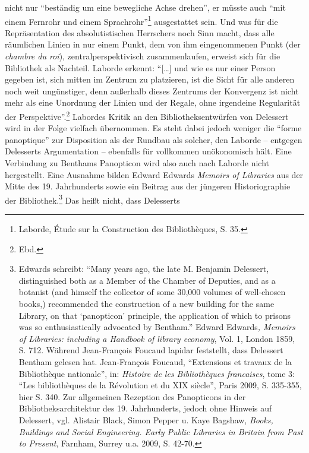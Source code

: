 nicht nur \enquote{beständig um eine bewegliche Achse drehen}, er müsste
auch \enquote{mit einem Fernrohr und einem Sprachrohr}\footnote{Laborde,
  Étude sur la Construction des Bibliothèques, S. 35.} ausgestattet
sein. Und was für die Repräsentation des absolutistischen Herrschers
noch Sinn macht, dass alle räumlichen Linien in nur einem Punkt, dem von
ihm eingenommenen Punkt (der \emph{chambre du roi}),
zentralperspektivisch zusammenlaufen, erweist sich für die Bibliothek
als Nachteil. Laborde erkennt: \enquote{{[}\ldots{}{]} und wie es nur
einer Person gegeben ist, sich mitten im Zentrum zu platzieren, ist die
Sicht für alle anderen noch weit ungünstiger, denn außerhalb dieses
Zentrums der Konvergenz ist nicht mehr als eine Unordnung der Linien und
der Regale, ohne irgendeine Regularität der Perspektive}.\footnote{Ebd.}
Labordes Kritik an den Bibliotheksentwürfen von Delessert wird in der
Folge vielfach übernommen. Es steht dabei jedoch weniger die
\enquote{forme panoptique} zur Disposition als der Rundbau als solcher,
den Laborde -- entgegen Delesserts Argumentation -- ebenfalls für
vollkommen unökonomisch hält. Eine Verbindung zu Benthams Panopticon
wird also auch nach Laborde nicht hergestellt. Eine Ausnahme bilden
Edward Edwards \emph{Memoirs of Libraries} aus der Mitte des 19.
Jahrhunderts sowie ein Beitrag aus der jüngeren Historiographie der
Bibliothek.\footnote{Edwards schreibt: \enquote{Many years ago, the late
  M. Benjamin Delessert, distinguished both as a Member of the Chamber
  of Deputies, and as a botanist (and himself the collector of some
  30,000 volumes of well-chosen books,) recommended the construction of
  a new building for the same Library, on that \enquote{panopticon}
  principle, the application of which to prisons was so enthusiastically
  advocated by Bentham.} Edward Edwards\emph{, Memoirs of Libraries:
  including a Handbook of library economy}, Vol. 1, London 1859, S. 712.
  Während Jean-François Foucaud lapidar feststellt, dass Delessert
  Bentham gelesen hat. Jean-François Foucaud, \enquote{Extensions et
  travaux de la Bibliothèque nationale}, in: \emph{Histoire de les
  Bibliothèques francaises}, tome 3: \enquote{Les bibliothèques de la
  Révolution et du XIX siècle}, Paris 2009, S. 335-355, hier S. 340. Zur
  allgemeinen Rezeption des Panopticons in der Bibliotheksarchitektur
  des 19. Jahrhunderts, jedoch ohne Hinweis auf Delessert, vgl. Alistair
  Black, Simon Pepper u. Kaye Bagshaw, \emph{Books, Buildings and Social
  Engineering. Early Public Libraries in Britain from Past to Present},
  Farnham, Surrey u.a. 2009, S. 42-70.} Das heißt nicht, dass Delesserts
